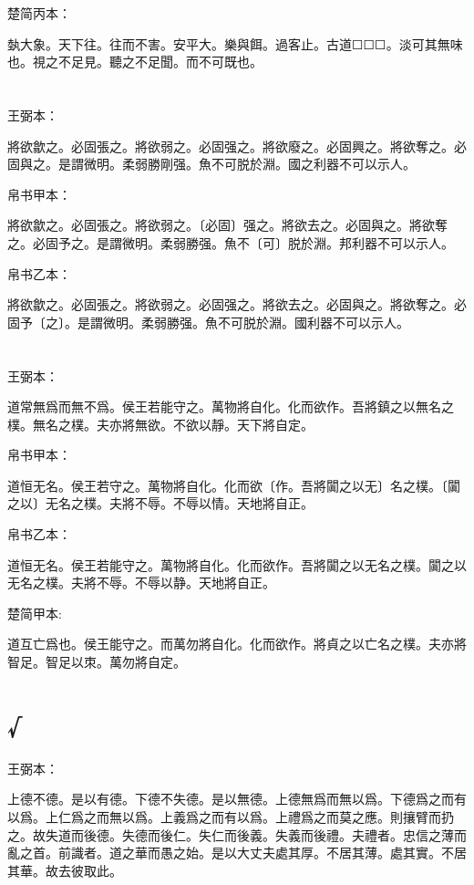 \documentclass[a5paper]{ctexbook}
\begin{document}
    楚简丙本：

    埶大象。天下往。往而不害。安平大。樂與餌。過客止。古道☐☐☐。淡可其無味也。視之不足見。聽之不足聞。而不可既也。

    \chapter{}
    王弼本：

    將欲歙之。必固張之。將欲弱之。必固强之。將欲廢之。必固興之。將欲奪之。必固與之。是謂微明。柔弱勝剛强。魚不可脱於淵。國之利器不可以示人。

    
    帛书甲本：

    將欲歙之。必固張之。將欲弱之。〔必固〕强之。將欲去之。必固與之。將欲奪之。必固予之。是謂微明。柔弱勝强。魚不〔可〕脱於淵。邦利器不可以示人。

    帛书乙本：

    將欲歙之。必固張之。將欲弱之。必固强之。將欲去之。必固與之。將欲奪之。必固予〔之〕。是謂微明。柔弱勝强。魚不可脱於淵。國利器不可以示人。

    \chapter{}
    王弼本：

    道常無爲而無不爲。侯王若能守之。萬物將自化。化而欲作。吾將鎮之以無名之樸。無名之樸。夫亦將無欲。不欲以靜。天下將自定。

    
    帛书甲本：

    道恒无名。侯王若守之。萬物將自化。化而欲〔作。吾將闐之以无〕名之樸。〔闐之以〕无名之樸。夫將不辱。不辱以情。天地將自正。

    帛书乙本：

    道恒无名。侯王若能守之。萬物將自化。化而欲作。吾將闐之以无名之樸。闐之以无名之樸。夫將不辱。不辱以静。天地將自正。

    楚简甲本:

    道互亡爲也。侯王能守之。而萬勿將自化。化而欲作。將貞之以亡名之樸。夫亦將智足。智足以朿。萬勿將自定。

    \chapter{√}
    王弼本：

    上德不德。是以有德。下德不失德。是以無德。上德無爲而無以爲。下德爲之而有以爲。上仁爲之而無以爲。上義爲之而有以爲。上禮爲之而莫之應。則攘臂而扔之。故失道而後德。失德而後仁。失仁而後義。失義而後禮。夫禮者。忠信之薄而亂之首。前識者。道之華而愚之始。是以大丈夫處其厚。不居其薄。處其實。不居其華。故去彼取此。
\end{document}
